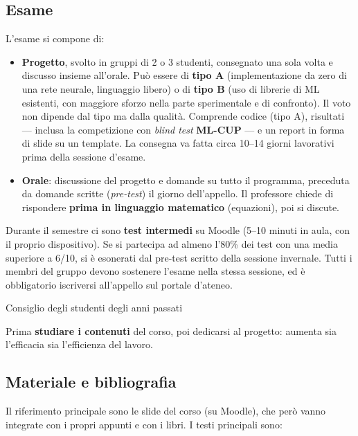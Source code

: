 \subsection{Esame}\label{esame}

L'esame si compone di:

\begin{itemize}
\tightlist
\item
  \textbf{Progetto}, svolto in gruppi di 2 o 3 studenti, consegnato una
  sola volta e discusso insieme all'orale. Può essere di \textbf{tipo A}
  (implementazione da zero di una rete neurale, linguaggio libero) o di
  \textbf{tipo B} (uso di librerie di ML esistenti, con maggiore sforzo
  nella parte sperimentale e di confronto). Il voto non dipende dal tipo
  ma dalla qualità. Comprende codice (tipo A), risultati --- inclusa la
  competizione con \emph{blind test} \textbf{ML-CUP} --- e un report in
  forma di slide su un template. La consegna va fatta circa 10--14
  giorni lavorativi prima della sessione d'esame.
\item
  \textbf{Orale}: discussione del progetto e domande su tutto il
  programma, preceduta da domande scritte (\emph{pre-test}) il giorno
  dell'appello. Il professore chiede di rispondere \textbf{prima in
  linguaggio matematico} (equazioni), poi si discute.
\end{itemize}

Durante il semestre ci sono \textbf{test intermedi} su Moodle (5--10
minuti in aula, con il proprio dispositivo). Se si partecipa ad almeno
l'80\% dei test con una media superiore a 6/10, si è esonerati dal
pre-test scritto della sessione invernale. Tutti i membri del gruppo
devono sostenere l'esame nella stessa sessione, ed è obbligatorio
iscriversi all'appello sul portale d'ateneo.

\begin{boxtip}{Consiglio degli studenti degli anni passati}

Prima \textbf{studiare i contenuti} del corso, poi dedicarsi al
progetto: aumenta sia l'efficacia sia l'efficienza del lavoro.

\end{boxtip}

\subsection{Materiale e bibliografia}\label{materiale-e-bibliografia}

Il riferimento principale sono le slide del corso (su Moodle), che però
vanno integrate con i propri appunti e con i libri. I testi principali
sono:

